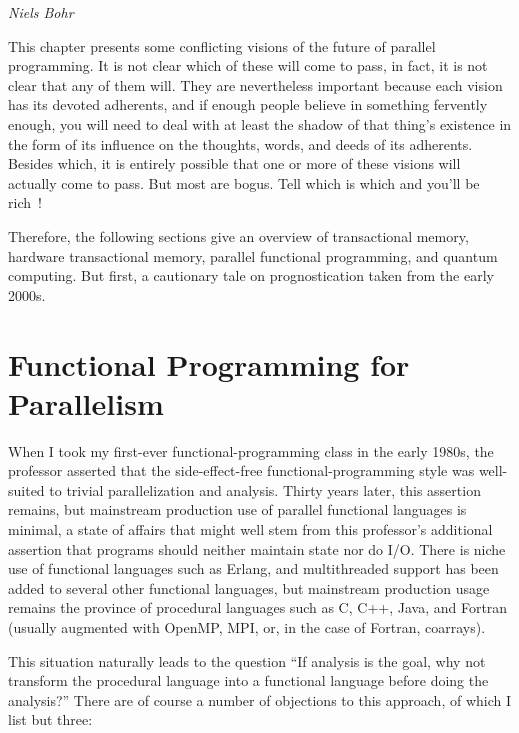 
%
	 {\emph{Niels Bohr}}

This chapter presents some conflicting visions of the future of parallel
programming.
It is not clear which of these will come to pass, in fact, it is not
clear that any of them will.
They are nevertheless important because each vision has its devoted
adherents, and if enough people believe in something fervently enough,
you will need to deal with at least the shadow of that thing's existence
in the form of its
influence on the thoughts, words, and deeds of its adherents.
Besides which, it is entirely possible that one or more of these visions
will actually come to pass.
But most are bogus.
Tell which is which and you'll be rich~\cite{KeithRSpitz1977}!

Therefore, the following sections give an overview of transactional
memory, hardware transactional memory,
parallel functional programming, and quantum computing.
But first, a cautionary tale on prognostication taken from the early 2000s.





\section{Functional Programming for Parallelism}
\label{sec:future:Functional Programming for Parallelism}

When I took my first-ever functional-programming class in the early 1980s,
the professor asserted that the side-effect-free functional-programming
style was well-suited to trivial parallelization and analysis.
Thirty years later, this assertion remains, but mainstream production
use of parallel functional languages is minimal, a state of affairs
that might well stem from this professor's additional assertion that
programs should neither maintain state nor do I/O.
There is niche use of functional languages such as Erlang, and
multithreaded support has been added to several other functional languages,
but mainstream production usage remains the province of procedural
languages such as C, C++, Java, and Fortran (usually augmented with
OpenMP, MPI, or, in the case of Fortran, coarrays).

This situation naturally leads to the question ``If analysis is the goal,
why not transform the procedural language into a functional language before
doing the analysis?''
There are of course a number of objections to this approach, of which
I list but three:

